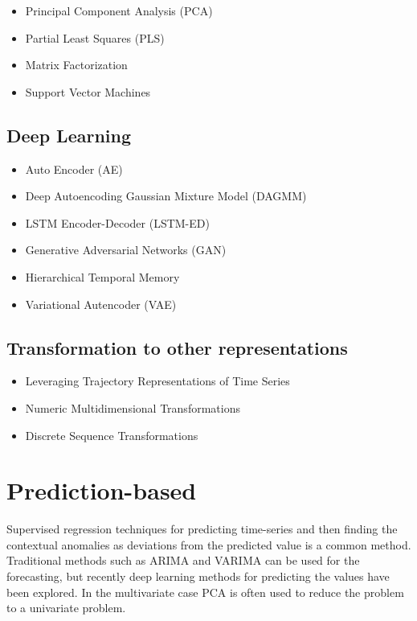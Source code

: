 \begin{itemize}
    \item Principal Component Analysis (PCA) \cite{Li2019a}
    \item Partial Least Squares (PLS) \cite{Li2019a}
    \item Matrix Factorization \cite{Aggarwal2013a}
    \item Support Vector Machines \cite{Aggarwal2013a}
\end{itemize}

\subsection{Deep Learning}

\begin{itemize}
    \item Auto Encoder (AE) \cite{Li2019a}
    \item Deep Autoencoding Gaussian Mixture Model (DAGMM) \cite{Li2019a}
    \item LSTM Encoder-Decoder (LSTM-ED) \cite{Li2019a}
    \item Generative Adversarial Networks (GAN) \cite{Li2019a}
    \item Hierarchical Temporal Memory
\item Variational Autencoder (VAE)
\end{itemize}

\subsection{Transformation to other representations}

\begin{itemize}
    \item Leveraging Trajectory Representations of Time Series \cite{Aggarwal2013a}
    \item Numeric Multidimensional Transformations \cite{Aggarwal2013a}
    \item Discrete Sequence Transformations \cite{Aggarwal2013a}
\end{itemize}

\newpage



\section{Prediction-based}

Supervised regression techniques for predicting time-series and then finding the contextual anomalies as deviations from the predicted value is a common method. Traditional methods such as ARIMA and VARIMA can be used for the forecasting, but recently deep learning methods for predicting the values have been explored. In the multivariate case PCA is often used to reduce the problem to a univariate problem.

